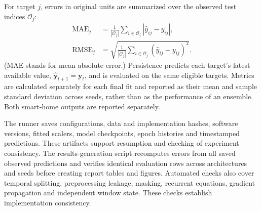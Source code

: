 For target $j$, errors in original units are summarized over the observed test
indices $\mathcal{O}_j$:
\begin{align}
 \mathrm{MAE}_j &= \frac{1}{|\mathcal{O}_j|}
     \sum_{i\in\mathcal{O}_j}|\hat y_{ij}-y_{ij}|,\\
 \mathrm{RMSE}_j &= \sqrt{\frac{1}{|\mathcal{O}_j|}
     \sum_{i\in\mathcal{O}_j}(\hat y_{ij}-y_{ij})^2}.
\end{align}
(MAE stands for mean absolute error.)
Persistence predicts each target's latest available value,
$\hat{\mathbf{y}}_{t+1}=\mathbf{y}_t$, and is evaluated on the same eligible
targets. Metrics are calculated separately for each final fit and reported as
their mean and sample standard deviation across seeds, rather than as the
performance of an ensemble. Both smart-home outputs are reported separately.

The runner saves configurations, data and implementation hashes, software
versions, fitted scalers, model checkpoints, epoch histories and timestamped
predictions. These artifacts support resumption and checking of experiment
consistency. The results-generation script recomputes errors from all saved
observed predictions and verifies identical evaluation rows across architectures
and seeds before creating report tables and figures. Automated checks also cover
temporal splitting, preprocessing leakage, masking, recurrent equations,
gradient propagation and independent window state. These checks establish
implementation consistency.
